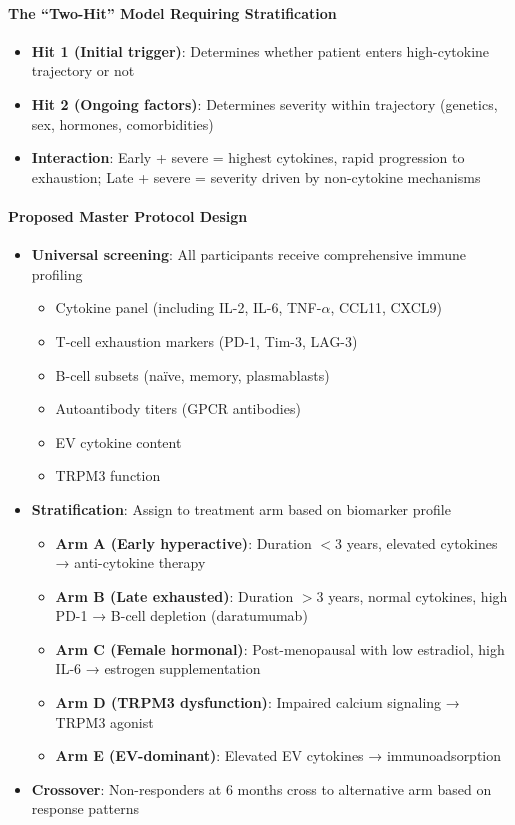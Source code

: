 \paragraph{The ``Two-Hit'' Model Requiring Stratification}
\begin{itemize}
    \item \textbf{Hit 1 (Initial trigger)}: Determines whether patient enters high-cytokine trajectory or not
    \item \textbf{Hit 2 (Ongoing factors)}: Determines severity within trajectory (genetics, sex, hormones, comorbidities)
    \item \textbf{Interaction}: Early + severe = highest cytokines, rapid progression to exhaustion; Late + severe = severity driven by non-cytokine mechanisms
\end{itemize}

\paragraph{Proposed Master Protocol Design}
\begin{itemize}
    \item \textbf{Universal screening}: All participants receive comprehensive immune profiling
    \begin{itemize}
        \item Cytokine panel (including IL-2, IL-6, TNF-$\alpha$, CCL11, CXCL9)
        \item T-cell exhaustion markers (PD-1, Tim-3, LAG-3)
        \item B-cell subsets (naïve, memory, plasmablasts)
        \item Autoantibody titers (GPCR antibodies)
        \item EV cytokine content
        \item TRPM3 function
    \end{itemize}
    \item \textbf{Stratification}: Assign to treatment arm based on biomarker profile
    \begin{itemize}
        \item \textbf{Arm A (Early hyperactive)}: Duration $<$3 years, elevated cytokines → anti-cytokine therapy
        \item \textbf{Arm B (Late exhausted)}: Duration $>$3 years, normal cytokines, high PD-1 → B-cell depletion (daratumumab)
        \item \textbf{Arm C (Female hormonal)}: Post-menopausal with low estradiol, high IL-6 → estrogen supplementation
        \item \textbf{Arm D (TRPM3 dysfunction)}: Impaired calcium signaling → TRPM3 agonist
        \item \textbf{Arm E (EV-dominant)}: Elevated EV cytokines → immunoadsorption
    \end{itemize}
    \item \textbf{Crossover}: Non-responders at 6 months cross to alternative arm based on response patterns
\end{itemize}

